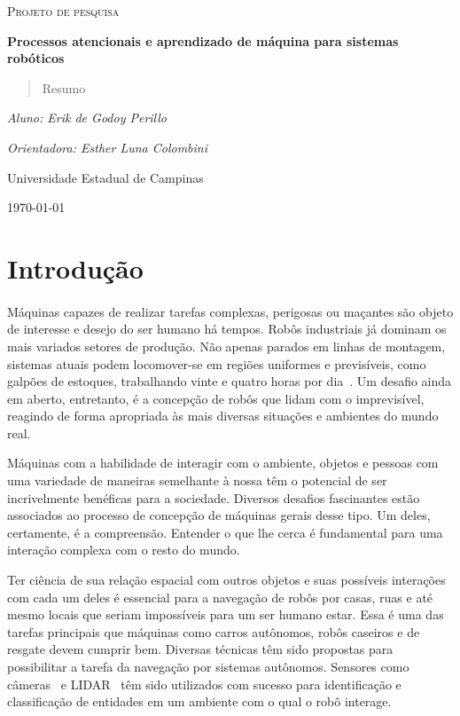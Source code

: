 \documentclass[10pt]{article}
\begin{document}
\begin{titlepage}
	\centering
	{\scshape\Large Projeto de pesquisa\par}
	\vspace{1.5cm}
	{\huge\bfseries Processos atencionais e aprendizado de máquina 
		para sistemas robóticos\par}
	\vspace{2cm}
	\begin{abstract}
		Resumo
	\end{abstract}
	{\itshape Aluno: Erik de Godoy Perillo\par}
	{\itshape Orientadora: Esther Luna Colombini\par}
	\vfill
	Universidade Estadual de Campinas 
	\vfill
	{\large \today\par}
\end{titlepage}

\newpage

\section{Introdução}
\paragraph{}
Máquinas capazes de realizar tarefas complexas, perigosas ou maçantes são
objeto de interesse e desejo do ser humano há tempos. 
Robôs industriais já dominam os mais variados setores de produção. 
Não apenas parados em linhas de montagem, sistemas atuais podem locomover-se
em regiões uniformes e previsíveis, como galpões de estoques, trabalhando
vinte e quatro horas por dia~\cite{warehouse}.
Um desafio ainda em aberto, entretanto, é a concepção de robôs que lidam com 
o imprevisível, reagindo de forma apropriada às mais diversas situações 
e ambientes do mundo real. 

Máquinas com a habilidade de interagir com o ambiente, objetos e pessoas 
com uma variedade de maneiras semelhante à nossa têm o potencial de ser 
incrivelmente benéficas para a sociedade. 
Diversos desafios fascinantes estão associados ao processo de concepção de 
máquinas gerais desse tipo. 
Um deles, certamente, é a compreensão. 
Entender o que lhe cerca é fundamental para uma interação complexa com o resto
do mundo. 

Ter ciência de sua relação espacial com outros objetos e 
suas possíveis interações com cada um deles é essencial para a navegação 
de robôs por casas, ruas e até mesmo locais que seriam impossíveis 
para um ser humano estar. 
Essa é uma das tarefas principais que máquinas como carros autônomos, 
robôs caseiros e de resgate devem cumprir bem.
Diversas técnicas têm sido propostas para possibilitar a tarefa da navegação
por sistemas autônomos. 
Sensores como câmeras~\cite{vision} e LIDAR~\cite{car} têm sido utilizados
com sucesso para identificação e classificação de entidades em um ambiente com
o qual o robô interage. 
\end{document}
